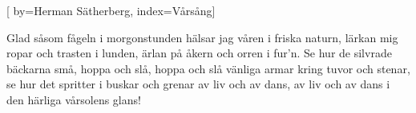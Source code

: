 

[
by={Herman Sätherberg},
index={Vårsång}]

\beginverse* 
Glad såsom fågeln i morgonstunden 
hälsar jag våren i friska naturn,
lärkan mig ropar och trasten i lunden, 
ärlan på åkern och orren i fur'n. 
Se hur de silvrade bäckarna små, 
hoppa och slå, hoppa och slå
vänliga armar kring tuvor och stenar,
se hur det spritter i buskar och grenar 
av liv och av dans, av liv och av dans
i den härliga vårsolens glans!
\endverse
\endsong


